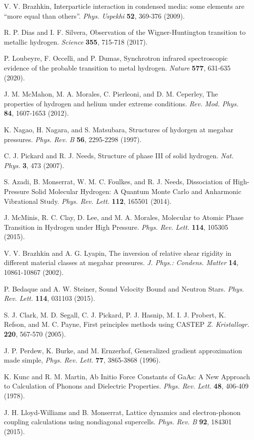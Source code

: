 \documentclass[aps,prl,groupedaddress,fleqn,twocolumn,10pt]{revtex4-1}
\begin{document}
\begin{thebibliography}{99}
 V. V. Brazhkin, Interparticle interaction in condensed media: some elements are ``more equal than others''. {\it Phys. Uspekhi} {\bf 52}, 369-376 (2009).

 R. P. Dias and I. F. Silvera, Observation of the Wigner-Huntington transition to metallic hydrogen. {\it Science} {\bf 355}, 715-718 (2017).

 P. Loubeyre, F. Occelli, and P. Dumas, Synchrotron infrared spectroscopic evidence of the probable transition to metal hydrogen. {\it Nature} {\bf 577}, 631-635 (2020).

 J. M. McMahon, M. A. Morales, C. Pierleoni, and D. M. Ceperley, The properties of hydrogen and helium under extreme conditions. {\it Rev. Mod. Phys.} {\bf 84}, 1607-1653 (2012).

 K. Nagao, H. Nagara, and S. Matsubara, Structures of hydorgen at megabar pressures. {\it Phys. Rev. B} {\bf 56}, 2295-2298 (1997).

 C. J. Pickard and R. J. Needs, Structure of phase III of solid hydrogen. {\it Nat. Phys.} {\bf 3}, 473 (2007).

 S. Azadi, B. Monserrat, W. M. C. Foulkes, and R. J. Needs, Dissociation of High-Pressure Solid Molecular Hydrogen: A Quantum Monte Carlo and Anharmonic Vibrational Study. {\it Phys. Rev. Lett.} {\bf 112}, 165501 (2014).

 J. McMinis, R. C. Clay, D. Lee, and M. A. Morales, Molecular to Atomic Phase Transition in Hydrogen under High Pressure. {\it Phys. Rev. Lett.} {\bf 114}, 105305 (2015).

 V. V. Brazhkin and A. G. Lyapin, The inversion of relative shear rigidity in different material classes at megabar pressures. {\it J. Phys.: Condens. Matter} {\bf 14}, 10861-10867 (2002).

 P. Bedaque and A. W. Steiner, Sound Velocity Bound and Neutron Stars. {\it Phys. Rev. Lett.} {\bf 114}, 031103 (2015).

 S. J. Clark, M. D. Segall, C. J. Pickard, P. J. Hasnip, M. I. J. Probert, K. Refson, and M. C. Payne, First principles methods using CASTEP {\it Z. Kristallogr.} {\bf 220}, 567-570 (2005).

 J. P. Perdew, K. Burke, and M. Ernzerhof, Generalized gradient approximation made simple, {\it Phys. Rev. Lett.} {\bf 77}, 3865-3868 (1996).

 K. Kunc and R. M. Martin, Ab Initio Force Constants of GaAs: A New Approach to Calculation of Phonons and Dielectric Properties. {\it Phys. Rev. Lett.} {\bf 48}, 406-409 (1978).

 J. H. Lloyd-Williams and B. Monserrat, Lattice dynamics and electron-phonon coupling calculations using nondiagonal supercells. {\it Phys. Rev. B} {\bf 92}, 184301 (2015).

\end{thebibliography}
\end{document}
